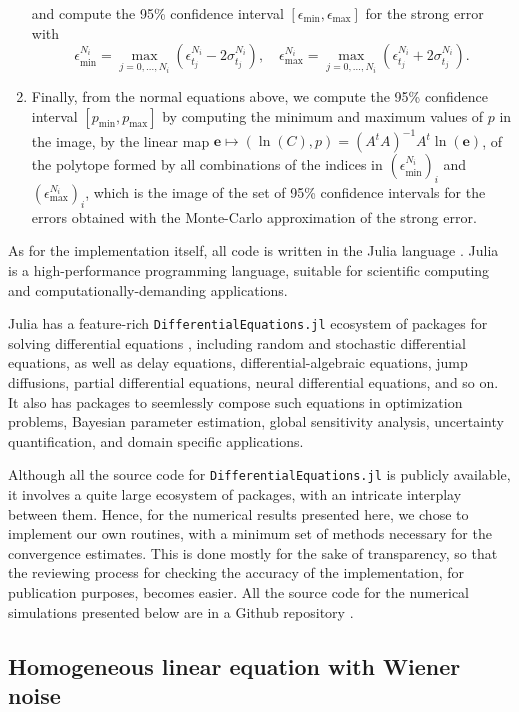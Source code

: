 \documentclass[reqno,12pt]{amsart}
\theoremstyle{plain} %
\theoremstyle{definition} %
\begin{document}
\begin{enumerate}
\[    \]
    and compute the 95\% confidence interval $[\epsilon_{\min}, \epsilon_{\max}]$ for the strong error with
    \[
        \epsilon_{\min}^{N_i} = \max_{j=0, \ldots, N_i} (\epsilon_{t_j}^{N_i} - 2\sigma_{t_j}^{N_i}), \quad \epsilon_{\max}^{N_i} = \max_{j=0, \ldots, N_i} (\epsilon_{t_j}^{N_i} + 2\sigma_{t_j}^{N_i}).
    \]
    \item Finally, from the normal equations above, we compute the 95\% confidence interval $[p_{\min}, p_{\max}]$ by computing the minimum and maximum values of $p$ in the image, by the linear map $\mathbf{e} \mapsto (\ln(C), p) = (A^tA)^{-1}A^t\ln(\mathbf{e})$, of the polytope formed by all combinations of the indices in $(\epsilon_{\min}^{N_i})_i$ and $(\epsilon_{\max}^{N_i})_i$, which is the image of the set of 95\% confidence intervals for the errors obtained with the Monte-Carlo approximation of the strong error.
\end{enumerate}

As for the implementation itself, all code is written in the Julia language \cite{Julia2017}. Julia is a high-performance programming language, suitable for scientific computing and computationally-demanding applications.

Julia has a feature-rich \texttt{DifferentialEquations.jl} ecosystem of packages for solving differential equations \cite{RackauckasNie2017}, including random and stochastic differential equations, as well as delay equations, differential-algebraic equations, jump diffusions, partial differential equations, neural differential equations, and so on. It also has packages to seemlessly compose such equations in optimization problems, Bayesian parameter estimation, global sensitivity analysis, uncertainty quantification, and domain specific applications.

Although all the source code for \texttt{DifferentialEquations.jl} is publicly available, it involves a quite large ecosystem of packages, with an intricate interplay between them. Hence, for the numerical results presented here, we chose to implement our own routines, with a minimum set of methods necessary for the convergence estimates. This is done mostly for the sake of transparency, so that the reviewing process for checking the accuracy of the implementation, for publication purposes, becomes easier. All the source code for the numerical simulations presented below are in a Github repository \cite{RODEConvEM2023}.

\subsection{Homogeneous linear equation with Wiener noise}
\label{seclinearhomogeneousrode}
\end{document}
